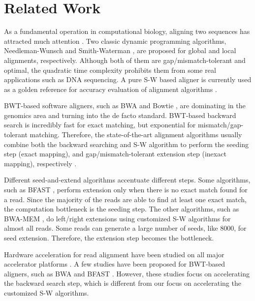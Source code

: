 \section{Related Work} 
\label{sec:related_work}
As a fundamental operation in computational biology, aligning two sequences has attracted much attention \cite{Aluru2014}. 
Two classic dynamic programming algorithms, Needleman-Wunsch \cite{Needleman1970} and Smith-Waterman \cite{Smith1981}, 
are proposed for global and local alignments, respectively. 
Although both of them are gap/mismatch-tolerant and optimal, 
the quadratic time complexity prohibits them from some real applications such as DNA sequencing. 
A pure S-W based aligner is currently used as a golden reference for accuracy evaluation of alignment algorithms \cite{Bowtie2}\cite{Knodel2011}.

BWT-based software aligners, such as BWA \cite{BWA} and Bowtie \cite{Bowtie}, 
are dominating in the genomics area and turning into the de facto standard. 
BWT-based backward search is incredibly fast for exact matching, but exponential for mismatch/gap-tolerant matching. 
Therefore, the state-of-the-art alignment algorithms usually combine both the backward searching and S-W algorithm 
to perform the seeding step (exact mapping), and gap/mismatch-tolerant extension step (inexact mapping), respectively \cite{Heng2010}.

Different seed-and-extend algorithms accentuate different steps. 
Some algorithms, such as BFAST \cite{BFAST}, perform extension only when there is no exact match found for a read. 
Since the majority of the reads are able to find at least one exact match, the computation bottleneck is the seeding step. 
The other algorithms, such as BWA-MEM \cite{BWA-MEM}, do left/right extensions using customized S-W algorithms for almost all reads. 
Some reads can generate a large number of seeds, like 8000, for seed extension. 
Therefore, the extension step becomes the bottleneck.

Hardware acceleration for read alignment have been studied on all major accelerator platforms \cite{Aluru2014}\cite{Fernandez2010}. 
A few studies have been proposed for BWT-based aligners,
such as BWA and BFAST \cite{Arram2013}\cite{Olson2012}\cite{Wayne2013}. 
However, these studies \cite{Arram2013}\cite{Olson2012}\cite{Wayne2013} focus on accelerating the backward search step, 
which is different from our focus on accelerating the customized S-W algorithms.

